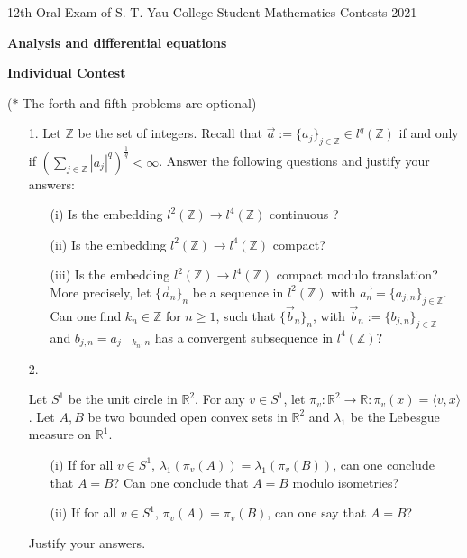 \documentclass[12pt]{article}
\begin{document}
\begin{center}
12th Oral Exam of S.-T. Yau College Student Mathematics Contests 2021\\

\vspace{0.1cm}

\Large {\bf Analysis and differential equations}\\

\vspace{0.1cm}

{\bf Individual Contest}

($\ast$ The forth and fifth problems are optional)

\end{center}

\vskip 1cm

\begin{itemize}

\item[1.]  Let $\mathbb{Z}$ be the set of integers. Recall that $\vec{a}:=\{a_{j}\}_{j\in \mathbb{Z}}\in l^{q}(\mathbb{Z})$ if and only if $(\sum_{j\in \mathbb{Z}}|a_{j}|^{q})^{\frac{1}{q}}<\infty$. Answer the following questions and justify your answers:
    \begin{itemize}
    \item[(i)] Is the embedding $l^{2}(\mathbb{Z})\rightarrow l^{4}(\mathbb{Z})$ continuous ?
    \item[(ii)] Is the embedding $l^{2}(\mathbb{Z})\rightarrow l^{4}(\mathbb{Z})$ compact?
    \item[(iii)] Is the embedding $l^{2}(\mathbb{Z})\rightarrow l^{4}(\mathbb{Z})$ compact modulo translation? More precisely, let $\{\vec{a}_{n}\}_{n}$ be a sequence in $l^{2}(\mathbb{Z})$ with $\vec{a_{n}}=\{a_{j,n}\}_{j\in \mathbb{Z}}$. Can one find $k_{n}\in \mathbb{Z}$ for $n\geq 1$, such that $\{\vec{b}_n\}_n$, with $\vec{b}_{n}:=\{b_{j,n}\}_{j\in\mathbb{Z}}$ and $b_{j,n}=a_{j-k_{n}, n}$ has a convergent subsequence in $l^{4}(\mathbb{Z})$?
    \end{itemize}



\vskip 1cm

\item[2.]

Let $S^1$ be the unit circle in $\mathbb{R}^2$. For any $v\in S^1$, let $\pi_v: \mathbb{R}^2 \rightarrow \mathbb{R}: \pi_v(x) = \langle v,x\rangle$. Let $A,B$ be two bounded open convex sets in $\mathbb{R}^2$ and $\lambda_1$ be the Lebesgue measure on $\mathbb{R}^1$.
    \begin{itemize}
    \item[(i)] If for all $v\in S^1$, $\lambda_1(\pi_v(A)) = \lambda_1(\pi_v(B))$, can one conclude that $A = B$? Can one conclude that $A=B$ modulo isometries?
    \item[(ii)] If for all $v\in S^1$, $\pi_v(A) = \pi_v(B)$, can one say that $A = B$?
    \end{itemize}
Justify your answers.


\end{itemize}
\end{document}
